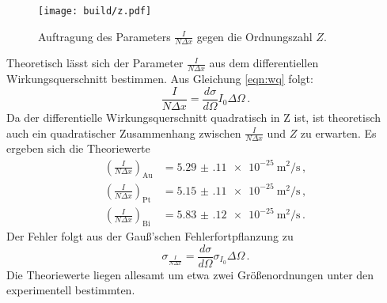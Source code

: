 \begin{figure}
  \centering
  \texttt{[image: build/z.pdf]}
  \caption{Auftragung des Parameters $\frac{I}{N \Delta x}$ gegen die Ordnungszahl $Z$.}
  \label{fig:z}
\end{figure}

Theoretisch lässt sich der Parameter $\frac{I}{N \Delta x}$ aus dem
differentiellen Wirkungsquerschnitt bestimmen. Aus Gleichung \eqref{eqn:wq} folgt:
\begin{equation}
  \frac{I}{N \Delta x}= \frac{d \sigma}{d \Omega}I_0 \Delta \Omega \,.
\end{equation}
Da der differentielle Wirkungsquerschnitt quadratisch in Z ist, ist theoretisch auch ein
quadratischer Zusammenhang zwischen $\frac{I}{N \Delta x}$ und $Z$ zu erwarten.
Es ergeben sich die Theoriewerte
\begin{align*}
  \left(\frac{I}{N \Delta x}\right)_{\text{Au}}&= \SI{5.29(11)e-25}{\metre\squared\per\second} \,, \\
  \left(\frac{I}{N \Delta x}\right)_{\text{Pt}}&= \SI{5.15(11)e-25}{\metre\squared\per\second} \,, \\
  \left(\frac{I}{N \Delta x}\right)_{\text{Bi}}&= \SI{5.83(12)e-25}{\metre\squared\per\second} \,.
\end{align*}
Der Fehler folgt aus der Gauß'schen Fehlerfortpflanzung zu
\begin{equation*}
  \sigma_{\frac{I}{N \Delta x}}=\frac{d \sigma}{d \Omega} \sigma_{I_0} \Delta \Omega \,.
\end{equation*}
Die Theoriewerte liegen allesamt um etwa zwei Größenordnungen unter den experimentell bestimmten.
